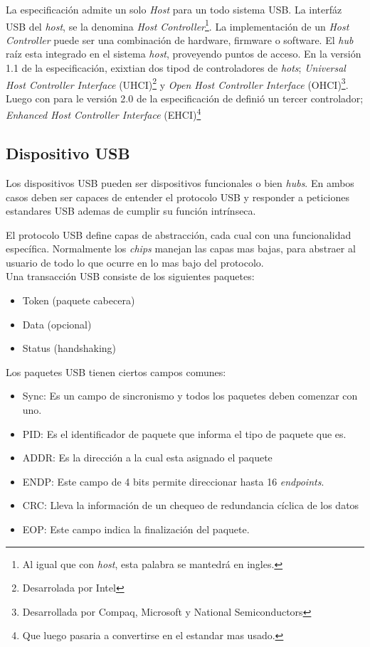 La especificaci\'on admite un solo \emph{Host} para un todo sistema USB. La
interf\'az USB del \emph{host}, se la denomina \emph{Host
Controller}\footnote{Al igual que con \emph{host}, esta palabra se mantedr\'a
en ingles.}. La implementaci\'on de un \emph{Host Controller} puede ser una
combinaci\'on de hardware, firmware o software. El \emph{hub} ra\'iz esta
integrado en el sistema \emph{host}, proveyendo puntos de acceso.
En la versi\'on 1.1 de la especificaci\'on, exixtian dos tipod de
controladores de \emph{hots}; \emph{Universal Host Controller Interface}
(UHCI)\footnote{Desarrolada por Intel} y \emph{Open Host Controller Interface}
(OHCI)\footnote{Desarrollada por Compaq, Microsoft y National Semiconductors}.
Luego con para le versi\'on 2.0 de la especificaci\'on de defini\'o un tercer
controlador; \emph{Enhanced Host Controller Interface} (EHCI)\footnote{Que
luego pasaria a convertirse en el estandar mas usado.}


\subsection{Dispositivo USB}

Los dispositivos USB pueden ser dispositivos funcionales o bien \emph{hubs}.
En ambos casos deben ser capaces de entender el protocolo USB y responder a
peticiones estandares USB ademas de cumplir su funci\'on intr\'inseca. 



El protocolo USB define capas de abstracci\'on, cada cual con una funcionalidad
espec\'ifica. Normalmente los \emph{chips} manejan las capas mas bajas, para
abstraer al usuario de todo lo que ocurre en lo mas bajo del protocolo.\\

Una transacci\'on USB consiste de los siguientes paquetes:
\begin{itemize}
 \item Token (paquete cabecera)
 \item Data (opcional)
 \item Status (handshaking)
\end{itemize}

Los paquetes USB tienen ciertos campos comunes: 
\begin{itemize}
 \item Sync: Es un campo de sincronismo y todos los paquetes deben comenzar
con uno.
 \item PID: Es el identificador de paquete que informa el tipo de paquete que
es.
 \item ADDR: Es la direcci\'on a la cual esta asignado el paquete
 \item ENDP: Este campo de 4 bits permite direccionar hasta 16
\emph{endpoints}.
 \item CRC: Lleva la informaci\'on de un chequeo de redundancia c\'iclica de
los datos
 \item EOP: Este campo indica la finalizaci\'on del paquete.
\end{itemize}

